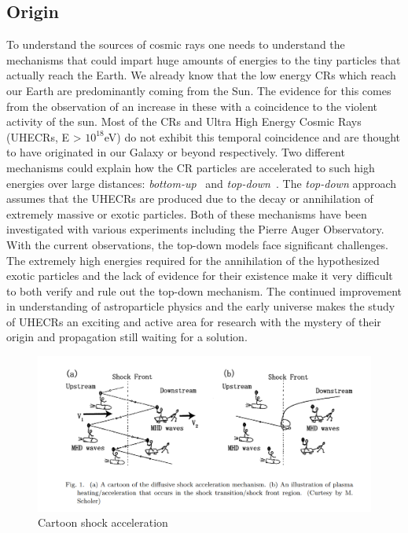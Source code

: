 \subsection{Origin}
\label{subsec:crorig}
To understand the sources of cosmic rays one needs to understand the mechanisms that could impart huge amounts of energies to the tiny particles that actually reach the Earth. We already know that the low energy CRs which reach our Earth are predominantly coming from the Sun. The evidence for this comes from the observation of an increase in these with a coincidence to the violent activity of the sun. Most of the CRs and Ultra High Energy Cosmic Rays (UHECRs, E > $10^{18}$eV) do not exhibit this temporal coincidence and are thought to have originated in our Galaxy or beyond respectively. Two different mechanisms could explain how the CR particles are accelerated to such high energies over large distances: \textit{bottom-up}~\cite{1984ARA&A..22..425H,Blandford_2000,1993A&A...272..161R} and \textit{top-down}~\cite{Bhattacharjee_2000,Busca_2006}. The \textit{top-down} approach assumes that the UHECRs are produced due to the decay or annihilation of extremely massive or exotic particles.
Both of these mechanisms have been investigated with various experiments including the Pierre Auger Observatory. With the current observations, the top-down models face significant challenges. The extremely high energies required for the annihilation of the hypothesized exotic particles and the lack of evidence for their existence make it very difficult to both verify and rule out the top-down mechanism. The continued improvement in understanding of astroparticle physics and the early universe makes the study of UHECRs an exciting and active area for research with the mystery of their origin and propagation still waiting for a solution. 

\begin{figure}[t!]
  \centering
  \includegraphics[width=14.5cm]{thesis_figures/CRnNu/Diffusive-shock-cartoon.png}
  \caption{Cartoon shock acceleration~\cite{article_Hoshino}}
  \label{fig:Shock_cartoon}
\end{figure}

